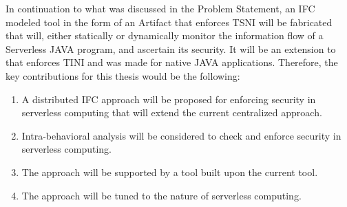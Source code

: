 In continuation to what was discussed in the Problem Statement, an IFC modeled tool in the form of an Artifact that enforces TSNI will be fabricated that will, either statically or dynamically monitor the information flow of a Serverless JAVA program, and ascertain its security. It will be an extension to \cite{Khakpour2018} that enforces TINI and was made for native JAVA applications. Therefore, the key contributions for this thesis would be the following:
\begin{enumerate}
	\item A distributed IFC approach will be proposed for enforcing security in serverless computing that will extend the current centralized approach\cite{Khakpour2018}.
	\item Intra-behavioral analysis will be considered to check and enforce security in serverless computing.
	\item The approach will be supported by a tool built upon the current tool\cite{Khakpour2018}.
	\item The approach will be tuned to the nature of serverless computing.
\end{enumerate}